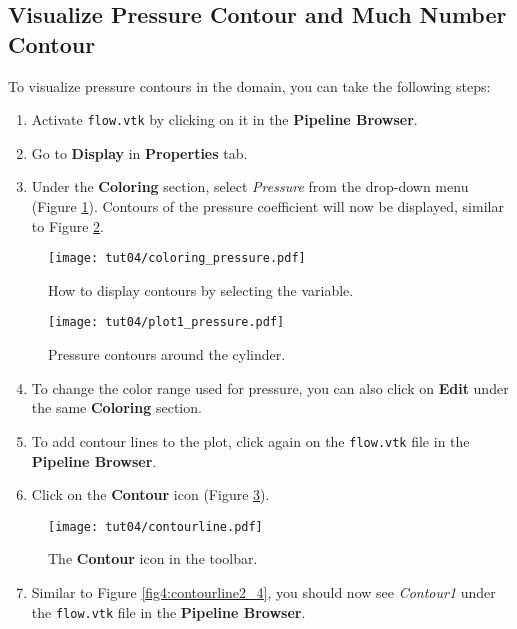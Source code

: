 \subsection{Visualize Pressure Contour and Much Number Contour}
To visualize pressure contours in the domain, you can take the following steps:
\begin{enumerate}[label=\arabic*)]
	\setcounter{enumi}{0}
	\item Activate \texttt{flow.vtk} by clicking on it in the \textbf{Pipeline Browser}.
	\item Go to \textbf{Display} in \textbf{Properties} tab.
	\item Under the \textbf{Coloring} section, select \textit{Pressure} from the drop-down menu (Figure \ref{fig4:pressure_coloring_4}). Contours of the pressure coefficient will now be displayed, similar to Figure \ref{fig4:pressure_plot1_4}.
\end{enumerate}
\begin{figure}[ht]
    \centering
    \texttt{[image: tut04/coloring\_pressure.pdf]}
    \caption{How to display contours by selecting the variable.}
    \label{fig4:pressure_coloring_4}
\end{figure}
\begin{figure}[ht]
    \centering
    \texttt{[image: tut04/plot1\_pressure.pdf]}
    \caption{Pressure contours around the cylinder.}
    \label{fig4:pressure_plot1_4}
\end{figure}
\begin{enumerate}[label=\arabic*)]
	\setcounter{enumi}{3}
	\item To change the color range used for pressure, you can also click on \textbf{Edit} under the same \textbf{Coloring} section.
	\item To add contour lines to the plot, click again on the \texttt{flow.vtk} file in the \textbf{Pipeline Browser}.
	\item Click on the \textbf{Contour} icon (Figure \ref{fig4:contourline1_4}).
\end{enumerate}
\begin{figure}[H]
    \centering
    \texttt{[image: tut04/contourline.pdf]}
    \caption{The \textbf{Contour} icon in the toolbar.}
    \label{fig4:contourline1_4}
\end{figure}
\begin{enumerate}[label=\arabic*)]
	\setcounter{enumi}{6}
	\item Similar to Figure \ref{fig4:contourline2_4}, you should now see \textit{Contour1} under the \texttt{flow.vtk} file in the \textbf{Pipeline Browser}.
\end{enumerate}
